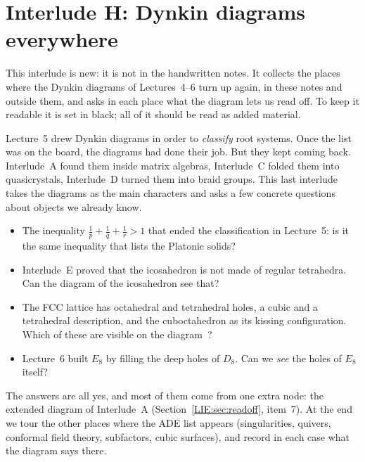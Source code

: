 

\chapter[Interlude H: Dynkin diagrams everywhere]{Interlude H: Dynkin diagrams everywhere}
\label{DYN:ch}

\begin{addedblock}
This interlude is new: it is not in the handwritten notes. It collects the places where the Dynkin
diagrams of Lectures~4--6 turn up again, in these notes and outside them, and asks in each place what
the diagram lets us read off. To keep it readable it is set in black; all of it should be read as
added material.
\end{addedblock}

Lecture~5 drew Dynkin diagrams in order to \emph{classify} root systems. Once the list was on the
board, the diagrams had done their job. But they kept coming back. Interlude~A found them inside
matrix algebras, Interlude~C folded them into quasicrystals, Interlude~D turned them into braid groups.
This last interlude takes the diagrams as the main characters and asks a few concrete questions about
objects we already know.
\begin{itemize}[nosep]
\item The inequality $\frac1p+\frac1q+\frac1r>1$ that ended the classification in Lecture~5: is it the
  same inequality that lists the Platonic solids?
\item Interlude~E proved that the icosahedron is not made of regular tetrahedra. Can the diagram of
  the icosahedron see that?
\item The FCC lattice has octahedral and tetrahedral holes, a cubic and a tetrahedral description,
  and the cuboctahedron as its kissing configuration. Which of these are visible on the diagram
  \,?
\item Lecture~6 built $E_8$ by filling the deep holes of $D_8$. Can we \emph{see} the holes of $E_8$
  itself?
\end{itemize}
The answers are all yes, and most of them come from one extra node: the extended diagram of
Interlude~A (Section~\ref{LIE:sec:readoff}, item~7). At the end we tour the other places where the
ADE list appears (singularities, quivers, conformal field theory, subfactors, cubic surfaces), and
record in each case what the diagram says there.

